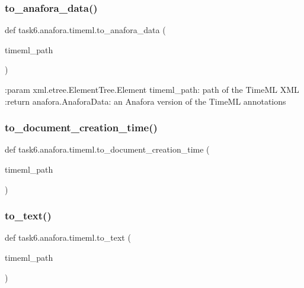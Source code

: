 \subsubsection{\texorpdfstring{to\+\_\+anafora\+\_\+data()}{to\_anafora\_data()}}
{\footnotesize\ttfamily def task6.\+anafora.\+timeml.\+to\+\_\+anafora\+\_\+data (\begin{DoxyParamCaption}\item[{}]{timeml\+\_\+path }\end{DoxyParamCaption})}

\begin{DoxyVerb}:param xml.etree.ElementTree.Element timeml_path: path of the TimeML XML
:return anafora.AnaforaData: an Anafora version of the TimeML annotations
\end{DoxyVerb}
 \mbox{\label{namespacetask6_1_1anafora_1_1timeml_adae0cff8bc3e9b83f8ce5666d621e4cf}} 
\subsubsection{\texorpdfstring{to\+\_\+document\+\_\+creation\+\_\+time()}{to\_document\_creation\_time()}}
{\footnotesize\ttfamily def task6.\+anafora.\+timeml.\+to\+\_\+document\+\_\+creation\+\_\+time (\begin{DoxyParamCaption}\item[{}]{timeml\+\_\+path }\end{DoxyParamCaption})}

\mbox{\label{namespacetask6_1_1anafora_1_1timeml_a9e1675119c8ba69f2bd6385ca97f0d8f}} 
\subsubsection{\texorpdfstring{to\+\_\+text()}{to\_text()}}
{\footnotesize\ttfamily def task6.\+anafora.\+timeml.\+to\+\_\+text (\begin{DoxyParamCaption}\item[{}]{timeml\+\_\+path }\end{DoxyParamCaption})}

